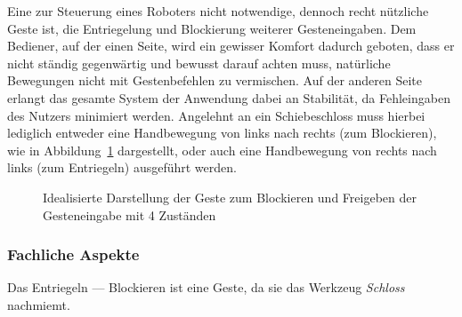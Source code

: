 Eine zur Steuerung eines Roboters nicht notwendige, dennoch recht n\"utzliche Geste ist, die Entriegelung und Blockierung weiterer Gesteneingaben. Dem Bediener, auf der einen Seite, wird ein gewisser Komfort dadurch geboten, dass er nicht st\"andig gegenw\"artig und bewusst darauf achten muss, nat\"urliche Bewegungen nicht mit Gestenbefehlen zu vermischen. Auf der anderen Seite erlangt das gesamte System der Anwendung dabei an Stabilit\"at, da Fehleingaben des Nutzers minimiert werden.
\newline
Angelehnt an ein Schiebeschloss muss hierbei lediglich entweder eine Handbewegung von links nach rechts (zum Blockieren), wie in Abbildung~\ref{fig:Lock_ideal} dargestellt, oder auch eine Handbewegung von rechts nach links (zum Entriegeln) ausgef\"uhrt werden.

\begin{figure}[htb]
\centering
{}
\caption[Idealisierte Darstellung der Geste zum Blockieren und Freigeben der Gesteneingabe mit 4 Zust\"anden]{Idealisierte Darstellung der Geste zum Blockieren und Freigeben der Gesteneingabe mit 4 Zust\"anden}
\label{fig:Lock_ideal}
\end{figure}

\subsubsection{Fachliche Aspekte}
Das Entriegeln --- Blockieren ist eine  Geste, da sie das Werkzeug \textit{Schloss} nachmiemt. 


